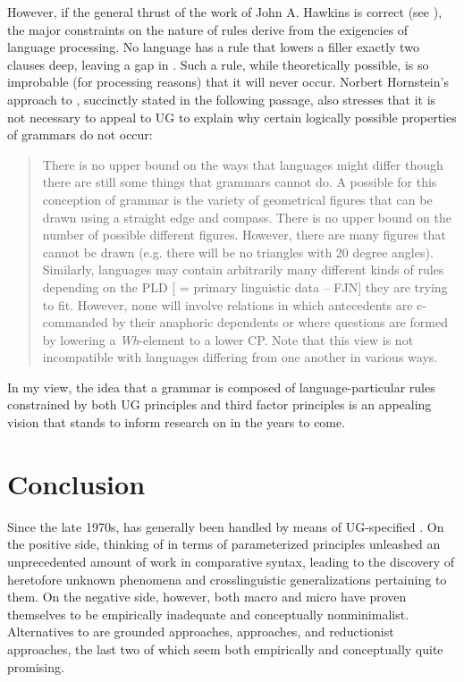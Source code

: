 \documentclass[output=paper,
modfonts
]{LSP/langsci}
\begin{document}
However, if the general thrust of the work of John A. Hawkins is correct
(see \citealt{hawkins1994,hawkins2004,hawkins2014}), the major constraints on the nature of
rules derive from the exigencies of language processing. No language has
a rule that lowers a filler exactly two clauses deep, leaving a gap in
. Such a rule, while theoretically possible, is so
improbable (for processing reasons) that it will never occur. Norbert
Hornstein's approach to , succinctly stated in the following
passage, also stresses that it is not necessary to appeal to UG to
explain why certain logically possible properties of grammars do not
occur:

\begin{quote}
There is no upper bound on the ways that languages might differ though
there are still some things that grammars cannot do. A possible 
for this conception of grammar is the variety of geometrical figures
that can be drawn using a straight edge and compass. There is no upper
bound on the number of possible different figures. However, there are
many figures that cannot be drawn (e.g. there will be no triangles with
20 degree angles). Similarly, languages may contain arbitrarily many
different kinds of rules depending on the PLD {[} = primary linguistic
data  --  FJN{]} they are trying to fit. However, none will involve
 relations in which antecedents are c-commanded by their
anaphoric dependents or where questions are formed by lowering a
\emph{Wh}-element to a lower CP. Note that this view is not incompatible
with languages differing from one another in various ways. \citep[167]{hornstein2009}
\end{quote}

In my view, the idea that a grammar is composed of language-particular
rules constrained by both UG principles and third factor principles is
an appealing vision that stands to inform research on  in the years to come.

\section{Conclusion}\label{sec:newmeyer:8}
Since the late 1970s,  has generally been
handled by means of UG-specified . On the positive side,
thinking of  in terms of parameterized principles unleashed an
unprecedented amount of work in comparative syntax, leading to the
discovery of heretofore unknown  phenomena and
crosslinguistic generalizations pertaining to them. On the negative
side, however, both macro and micro have proven
themselves to be empirically inadequate and conceptually nonminimalist.
Alternatives to  are grounded approaches, 
approaches, and reductionist approaches, the last two of which seem both
empirically and conceptually quite promising.
\end{document}
